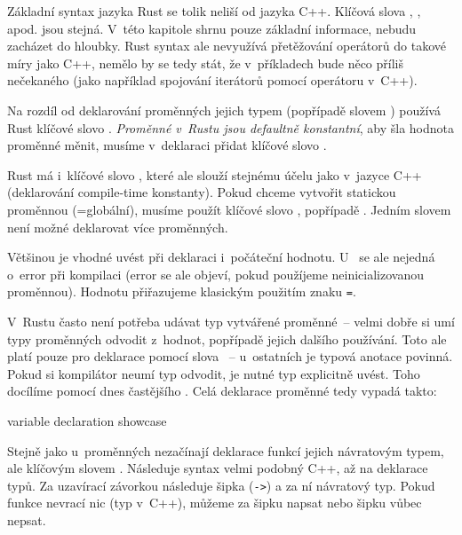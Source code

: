 \documentclass[main.tex]{subfiles}
\begin{document}

Základní syntax jazyka Rust se tolik neliší od jazyka C++. Klíčová slova ,
,  apod. jsou stejná. V~této kapitole shrnu pouze základní
informace, nebudu zacházet do hloubky. Rust syntax ale nevyužívá přetěžování operátorů
do takové míry jako C++, nemělo by se tedy stát, že v~příkladech bude něco příliš
nečekaného (jako například spojování iterátorů pomocí operátoru \icpp{|} v~C++).


Na rozdíl od deklarování proměnných jejich typem (popřípadě slovem ) používá
Rust klíčové slovo . \emph{Proměnné v~Rustu jsou defaultně konstantní}, aby
šla hodnota proměnné měnit, musíme v~deklaraci přidat klíčové slovo .

Rust má i~klíčové slovo , které ale slouží stejnému účelu jako
 v~jazyce C++ (deklarování compile-time konstanty).
Pokud chceme vytvořit statickou proměnnou (=globální), musíme použít klíčové slovo
, popřípadě . Jedním slovem není možné deklarovat více
proměnných.

Většinou je vhodné uvést při deklaraci i~počáteční hodnotu. U~ se ale
nejedná o~error při kompilaci (error se ale objeví, pokud použíjeme neinicializovanou
proměnnou). Hodnotu přiřazujeme klasickým použitím znaku \texttt{=}.

V~Rustu často není potřeba udávat typ vytvářené proměnné~-- velmi dobře si umí typy
proměnných odvodit z~hodnot, popřípadě jejich dalšího používání. Toto ale platí pouze
pro deklarace pomocí slova ~-- u~ostatních je typová anotace povinná. Pokud
si kompilátor neumí typ odvodit, je nutné typ explicitně uvést. Toho docílíme pomocí
dnes častějšího . Celá deklarace proměnné tedy vypadá takto:

\obrazek
{}
{variable declaration showcase}


Stejně jako u~proměnných nezačínají deklarace funkcí jejich návratovým typem, ale
klíčovým slovem . Následuje syntax velmi podobný C++, až na  deklarace typů. Za uzavírací závorkou následuje šipka (\texttt{->}) a za ní
návratový typ. Pokud funkce nevrací nic (typ  v~C++), můžeme za šipku napsat
 \irust{()} nebo šipku vůbec nepsat.
\end{document}
